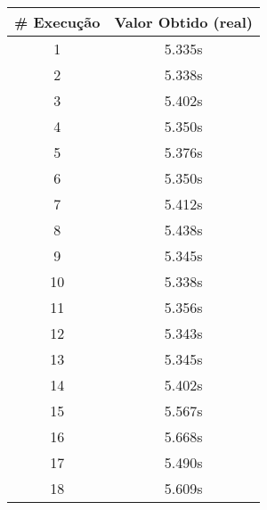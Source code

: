\documentclass[11pt]{article}
\begin{document}
\begin{table}[!h]
\begin{center}
\begin{minipage}{0.48\textwidth}
\begin{tabular}{| c | c |}
				\textbf{\# Execução} &  \textbf{Valor Obtido (real)} \\ \hline
				1 & 5.335s \\ \hline
				2 & 5.338s \\ \hline
				3 & 5.402s \\ \hline
				4 & 5.350s \\ \hline
				5 & 5.376s \\ \hline
				6 & 5.350s \\ \hline
				7 & 5.412s \\ \hline
				8 & 5.438s \\ \hline
				9 & 5.345s \\ \hline
				10 & 5.338s \\ \hline
				11 & 5.356s \\ \hline
				12 & 5.343s \\ \hline
				13 & 5.345s \\ \hline
				14 & 5.402s \\ \hline
				15 & 5.567s \\ \hline
				16 & 5.668s \\ \hline
				17 & 5.490s \\ \hline
				18 & 5.609s \\ \hline
			\end{tabular}
		\end{minipage}
	\end{center}
\end{table}

\pagebreak
\end{document}
